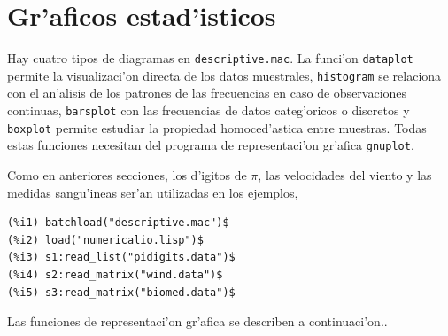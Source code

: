 \documentclass[spanish,12pt,a4paper]{article}
\begin{document}
\section{Gr'aficos estad'isticos}

Hay cuatro tipos de diagramas en \verb|descriptive.mac|. La funci'on \verb|dataplot| permite la visualizaci'on directa de los datos muestrales, \verb|histogram| se relaciona con el an'alisis de los patrones de las frecuencias en caso de observaciones continuas, \verb|barsplot| con las frecuencias de datos categ'oricos o discretos y \verb|boxplot| permite estudiar la propiedad homoced'astica entre muestras. Todas estas funciones necesitan del programa de representaci'on gr'afica \verb|gnuplot|.

Como en anteriores secciones, los d'igitos de $\pi$, las velocidades del viento y las medidas sangu'ineas ser'an utilizadas en los ejemplos,
\begin{verbatim}
(%i1) batchload("descriptive.mac")$
(%i2) load("numericalio.lisp")$
(%i3) s1:read_list("pidigits.data")$
(%i4) s2:read_matrix("wind.data")$
(%i5) s3:read_matrix("biomed.data")$
\end{verbatim}

Las funciones de representaci'on gr'afica se describen a continuaci'on..
\end{document}
